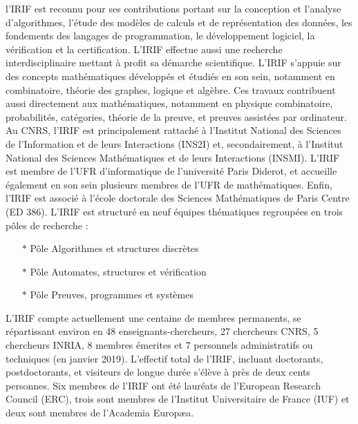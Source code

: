\documentclass{article}
\begin{document}
l’IRIF est reconnu pour ses contributions portant sur la conception et l’analyse d’algorithmes, l’étude des modèles de calculs et de représentation des données, les fondements des langages de programmation, le développement logiciel, la vérification et la certification. L’IRIF effectue aussi une recherche interdisciplinaire mettant à profit sa démarche scientifique.
\newline\newline
L’IRIF s'appuie sur des concepts mathématiques développés et étudiés en son sein, notamment en combinatoire, théorie des graphes, logique et algèbre. Ces travaux contribuent aussi directement aux mathématiques, notamment en physique combinatoire, probabilités, catégories, théorie de la preuve, et preuves assistées par ordinateur.
\newline\newline
Au CNRS, l'IRIF est principalement rattaché à l'Institut National des Sciences de l'Information et de leurs Interactions (INS2I) et, secondairement, à l'Institut National des Sciences Mathématiques et de leurs Interactions (INSMI). L'IRIF est membre de l'UFR d'informatique de l'université Paris Diderot, et accueille également en son sein plusieurs membres de l'UFR de mathématiques. Enfin, l'IRIF est associé à l'école doctorale des Sciences Mathématiques de Paris Centre (ED 386).
\newline\newline
L'IRIF est structuré en neuf équipes thématiques regroupées en trois pôles de recherche :
	\begin{itemize}
		\item[$\ast$]Pôle Algorithmes et structures discrètes
		\item[$\ast$]Pôle Automates, structures et vérification
		\item[$\ast$]Pôle Preuves, programmes et systèmes
	\end{itemize}
L'IRIF compte actuellement une centaine de membres permanents, se répartissant environ en 48 enseignants-chercheurs, 27 chercheurs CNRS, 5 chercheurs INRIA, 8 membres émerites et 7 personnels administratifs ou techniques (en janvier 2019). L'effectif total de l'IRIF, incluant doctorants, postdoctorants, et visiteurs de longue durée s'élève à près de deux cents personnes.
\newline\newline
Six membres de l'IRIF ont été lauréats de l'European Research Council (ERC), trois sont membres de l'Institut Universitaire de France (IUF) et deux sont membres de l'Academia Europæa. 
\end{document}
